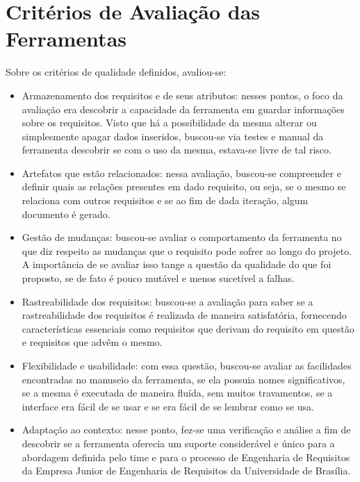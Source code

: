 \section[Critérios de Avaliação das Ferramentas]{Critérios de Avaliação das Ferramentas}
Sobre os critérios de qualidade definidos, avaliou-se:

\begin{itemize}
  \item Armazenamento dos requisitos e de seus atributos: nesses pontos, o foco da avaliação era descobrir a capacidade da ferramenta em guardar informações sobre os requisitos. Visto que há a possibilidade da mesma alterar ou simplesmente apagar dados inseridos, buscou-se via testes e manual da ferramenta descobrir se com o uso da mesma, estava-se livre de tal risco.

  \item Artefatos que estão relacionados: nessa avaliação, buscou-se compreender e definir quais as relações presentes em dado requisito, ou seja, se o mesmo se relaciona com outros requisitos e se ao fim de dada iteração, algum documento é gerado.

  \item Gestão de mudanças: buscou-se avaliar o comportamento da ferramenta no que diz respeito as mudanças que o requisito pode sofrer ao longo do projeto. A importância de se avaliar isso tange a questão da qualidade do que foi proposto, se de fato é pouco mutável e menos sucetível a falhas.

  \item Rastreabilidade dos requisitos: buscou-se a avaliação para saber se a rastreabilidade dos requisitos é realizada de maneira satisfatória, fornecendo características essenciais como requisitos que derivam do requisito em questão e requisitos que advêm o mesmo.

  \item Flexibilidade e usabilidade: com essa questão, buscou-se avaliar as facilidades encontradas no manuseio da ferramenta, se ela possuia nomes significativos, se a mesma é executada de maneira fluída, sem muitos travamentos, se a interface era fácil de se usar e se era fácil de se lembrar como se usa.

  \item Adaptação ao contexto: nesse ponto, fez-se uma verificação e análise a fim de descobrir se a ferramenta oferecia um suporte considerável e único para a abordagem definida pelo time e para o processo de Engenharia de Requisitos da Empresa Junior de Engenharia de Requisitos da Universidade de Brasília.
\end{itemize}

